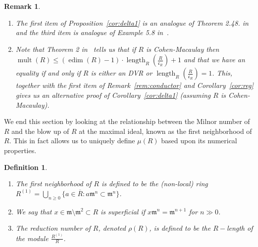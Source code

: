 \documentclass{article}
\newtheorem{definition}[theorem]{Definition}
\newtheorem{lemma}[theorem]{Lemma}
\newtheorem{remark}[theorem]{Remark}
\DeclareMathOperator{\length}{length}
\DeclareMathOperator{\edim}{edim}
\DeclareMathOperator{\mult}{mult}
\numberwithin{theorem}{section}
\begin{document}
\begin{remark}
\begin{enumerate}
    \item \textup{The first item of Proposition~\ref{cor:delta1} is an analogue of Theorem 2.48. in~\cite{greuel2007introduction} and the third item is analogue of Example 5.8 in~\cite{ooishi1987genera}.  }
    \item \textup{Note that Theorem 2 in~\cite{d2025upper} tells us that if $R$ is Cohen-Macaulay then $\mult(R) \leq (\edim(R)-1)\cdot\length_R\left(\frac{R}{\mathfrak{c}_R}\right)+1$ and that we have an equality if and only if $R$ is either an DVR or $\length_R\left(\frac{R}{\mathfrak{c}_R}\right)=1$. This, together with the first item of Remark~\ref{rem:conductor} and Corollary~\ref{cor:reg} gives us an alternative proof of Corollary~\ref{cor:delta1} (assuming $R$ is Cohen-Macaulay).}
\end{enumerate}
\end{remark}




We end this section by looking at the relationship between the Milnor number of $R$ and the blow up of $R$ at the maximal ideal, known as the first neighborhood of $R$. This in fact allows us to uniquely define $\mu(R)$ based upon its numerical properties. 

\begin{definition}\label{def:blowup}
\begin{enumerate}
    \item The first neighborhood of $R$ is defined to be the (non-local) ring $R^{(1)}=\bigcup_{n \geq 0} \{a \in \overline{R} \colon a\mathfrak{m}^n \subset \mathfrak{m}^n\}$.
    \item We say that $x \in \mathfrak{m} \setminus \mathfrak{m}^2 \subset R$ is superficial if $x\mathfrak{m}^n=\mathfrak{m}^{n+1}$ for $n \gg 0$.
    \item The reduction number of $R$, denoted $\rho(R)$, is defined to be the $R-$length of the module $\frac{R^{(1)}}{R}$.
\end{enumerate} 
\end{definition}
\end{document}
